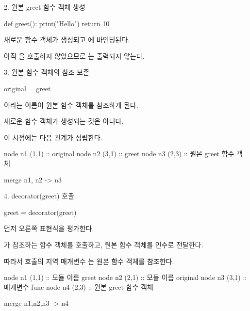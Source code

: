 \begin{dhknote}
\begin{dhksmry}[centered]
2. 원본 greet 함수 객체 생성
\end{dhksmry}
\end{dhknote}

\begin{dhkcode}
def greet():
    print("Hello")
    return 10
\end{dhkcode}

새로운 함수 객체가 생성되고 에 바인딩된다.

아직 을 호출하지 않았으므로 는 출력되지 않는다.

\begin{dhknote}
\begin{dhksmry}[centered]
3. 원본 함수 객체의 참조 보존
\end{dhksmry}
\end{dhknote}

\begin{dhkcode}
original = greet
\end{dhkcode}

이라는 이름이 원본 함수 객체를 참조하게 된다.

새로운 함수 객체가 생성되는 것은 아니다.

이 시점에는 다음 관계가 성립한다.

\begin{dhkdiagram}[in=6]
node n1 (1,1) :: original
node n2 (3,1) :: greet
node n3 (2,3) :: 원본 greet 함수 객체

merge n1, n2 -> n3
\end{dhkdiagram}

\begin{dhknote}
\begin{dhksmry}[centered]
4. decorator(greet) 호출
\end{dhksmry}
\end{dhknote}

\begin{dhkcode}
greet = decorator(greet)
\end{dhkcode}

먼저 오른쪽 표현식을 평가한다.

가 참조하는 함수 객체를 호출하고, 원본  함수 객체를 인수로 전달한다.

따라서  호출의 지역 매개변수 는 원본 함수 객체를 참조한다.

\begin{dhkdiagram}[in=6]
node n1 (1,1) :: 모듈 이름 greet
node n2 (2,1) :: 모듈 이름 original
node n3 (3,1) :: 매개변수 func
node n4 (2,3) :: 원본 greet 함수 객체

merge n1,n2,n3 ->  n4
\end{dhkdiagram}

